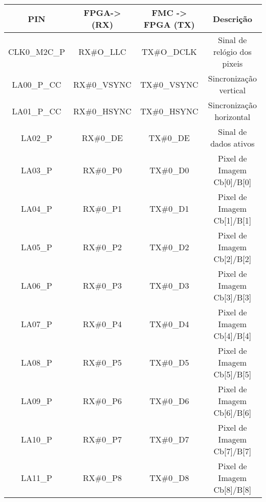 \begin{longtable}[]
	{|c|c|c|c|}
	\hline
	\centering
		
		\textbf{PIN} & \textbf{FPGA-> (RX)} & \textbf{FMC -> FPGA (TX)} & \textbf{Descrição}                   \\ \hline \endhead
		CLK0\_M2C\_P & RX\#O\_LLC                         & TX\#O\_DCLK                          & Sinal de relógio dos pixeis          \\ \hline
		LA00\_P\_CC  & RX\#0\_VSYNC                       & TX\#0\_VSYNC                         & Sincronização vertical               \\ \hline
		LA01\_P\_CC  & RX\#0\_HSYNC                       & TX\#0\_HSYNC                         & Sincronização horizontal             \\ \hline
		LA02\_P      & RX\#0\_DE                          & TX\#0\_DE                            & Sinal de dados ativos                \\ \hline
		LA03\_P      & RX\#0\_P0                          & TX\#0\_D0                            & Pixel de Imagem Cb{[}0{]}/B{[}0{]}   \\ \hline
		LA04\_P      & RX\#0\_P1                          & TX\#0\_D1                            & Pixel de Imagem Cb{[}1{]}/B{[}1{]}   \\ \hline
		LA05\_P      & RX\#0\_P2                          & TX\#0\_D2                            & Pixel de Imagem Cb{[}2{]}/B{[}2{]}   \\ \hline
		LA06\_P      & RX\#0\_P3                          & TX\#0\_D3                            & Pixel de Imagem Cb{[}3{]}/B{[}3{]}   \\ \hline
		LA07\_P      & RX\#0\_P4                          & TX\#0\_D4                            & Pixel de Imagem Cb{[}4{]}/B{[}4{]}   \\ \hline
		LA08\_P      & RX\#0\_P5                          & TX\#0\_D5                            & Pixel de Imagem Cb{[}5{]}/B{[}5{]}   \\ \hline
		LA09\_P      & RX\#0\_P6                          & TX\#0\_D6                            & Pixel de Imagem Cb{[}6{]}/B{[}6{]}   \\ \hline
		LA10\_P      & RX\#0\_P7                          & TX\#0\_D7                            & Pixel de Imagem Cb{[}7{]}/B{[}7{]}   \\ \hline
		LA11\_P      & RX\#0\_P8                          & TX\#0\_D8                            & Pixel de Imagem Cb{[}8{]}/B{[}8{]}   \\ \hline

\end{longtable}
